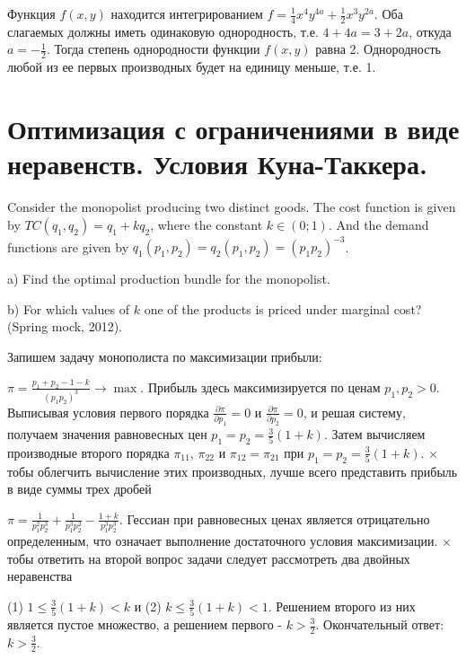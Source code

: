 \begin{solution}
Функция $f(x,y)$ находится интегрированием $f=\frac{1}{4} x^{4} y^{4a} +\frac{1}{2} x^{3} y^{2a} $. Оба слагаемых должны иметь одинаковую однородность, т.е. $4+4a=3+2a$, откуда $a=-\frac{1}{2} $. Тогда степень однородности функции $f(x,y)$ равна 2. Однородность любой из ее первых производных будет на единицу меньше, т.е. 1.
\end{solution}




\section{Оптимизация с ограничениями в виде неравенств. Условия Куна-Таккера.}

\begin{problem}
Consider the monopolist producing two distinct goods. The cost function is given by $TC(q_{1} ,q_{2} )=q_{1} +kq_{2} $, where the constant $k\in (0;1)$. And the demand functions are given by $q_{1} (p_{1} ,p_{2} )=q_{2} (p_{1} ,p_{2} )=(p_{1} p_{2} )^{-3} $. 

a) Find the optimal production bundle for the monopolist.

b) For which values of  $k$ one of the products is priced under marginal cost? (Spring mock, 2012).
\end{problem}


\begin{solution}
Запишем задачу монополиста по максимизации прибыли:

$\pi =\frac{p_{1} +p_{2} -1-k}{(p_{1} p_{2} )^{3} } \to \max $. Прибыль здесь максимизируется по ценам $p_{1} ,p_{2} >0$. Выписывая условия первого порядка $\frac{\partial \pi }{\partial p_{1} } =0$ и $\frac{\partial \pi }{\partial p_{2} } =0$, и решая систему, получаем значения равновесных цен $p_{1} =p_{2} =\frac{3}{5} (1+k)$. Затем вычисляем производные второго порядка $\pi _{11} $, $\pi _{22} $ и $\pi _{12} =\pi _{21} $ при $p_{1} =p_{2} =\frac{3}{5} (1+k)$. $\times$тобы облегчить вычисление этих производных, лучше всего представить прибыль в виде суммы трех дробей



$\pi =\frac{1}{p_{1}^{2} p_{2}^{3} } +\frac{1}{p_{1}^{3} p_{2}^{2} } -\frac{1+k}{p_{1}^{3} p_{2}^{3} } $. Гессиан при равновесных ценах является отрицательно определенным, что означает выполнение достаточного условия максимизации. $\times$тобы ответить на второй вопрос задачи следует рассмотреть два двойных неравенства

(1) $1\le \frac{3}{5} (1+k)<k$ и (2) $k\le \frac{3}{5} (1+k)<1$. Решением второго из них является пустое множество, а решением первого - $k>\frac{3}{2} $. Окончательный ответ: $k>\frac{3}{2} $.
\end{solution}


